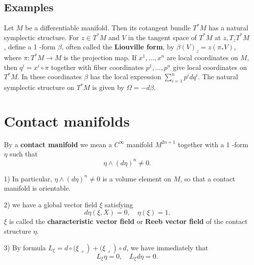 \subsection{Examples}
\begin{example}
    Let $M$ be a differentiable manifold. Then its cotangent bundle $T^* M$ has a natural symplectic structure. For $z \in T^* M$ and $V$ in the tangent space of $T^* M$ at $z, T_z T^* M$, define a 1 -form $\beta$, often called the \textbf{Liouville form}, by $\beta(V)_z=z\left(\pi_* V\right)$, where $\pi: T^* M \longrightarrow M$ is the projection map. If $x^1, \ldots, x^n$ are local coordinates on $M$, then $q^i=x^i \circ \pi$ together with fiber coordinates $p^1, \ldots, p^n$ give local coordinates on $T^* M$. In these coordinates $\beta$ has the local expression $\sum_{i=1}^n p^i d q^i$. The natural symplectic structure on $T^* M$ is given by $\Omega=-d \beta$.
\end{example}



\section{Contact manifolds}
\begin{definition}
    By a \textbf{contact manifold} we mean a $C^{\infty}$ manifold $M^{2 n+1}$ together with a 1 -form $\eta$ such that 
    \begin{equation}
        \eta \wedge(d \eta)^n \neq 0. 
    \end{equation}
\end{definition}
\begin{remark}
   1)  In particular, $\eta \wedge(d \eta)^n \neq 0$ is a volume element on $M$, so that a contact manifold is orientable. 
    
   2) we have a global vector field $\xi$ satisfying
    \begin{equation}
        d \eta(\xi, X)=0, \quad \eta(\xi)=1 .
    \end{equation}
$\xi$ is called the \textbf{characteristic vector field} or \textbf{Reeb vector field } of the contact structure $\eta$. 

3) By formula $\left.\left.L_{\xi}=d \circ(\xi\lrcorner\right)+(\xi\lrcorner\right) \circ d$, we have immediately that
\begin{equation}
    L_{\xi} \eta=0, \quad L_{\xi} d \eta=0 .
\end{equation}
\end{remark}

